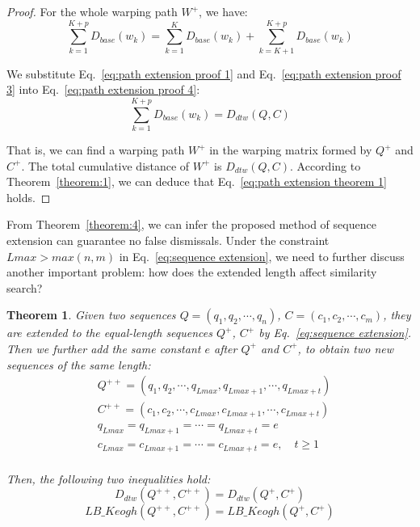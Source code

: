 \documentclass[10pt,journal,compsoc]{IEEEtran}
\newtheorem{theorem}{Theorem}
\begin{document}
\begin{proof}
For the whole warping path $W^+$, we have:
\begin{equation}\label{eq:path extension proof 4}
    \sum_{k=1}^{K+p} D_{base}(w_k)=\sum_{k=1}^{K} D_{base}(w_k)+\sum_{k=K+1}^{K+p} D_{base}(w_k)
\end{equation}

We substitute Eq.~\eqref{eq:path extension proof 1} and Eq.~\eqref{eq:path extension proof 3} into Eq.~\eqref{eq:path extension proof 4}:
\begin{equation}\label{eq:path extension proof 5}
    \sum_{k=1}^{K+p} D_{base}(w_k)=D_{dtw}(Q,C)
\end{equation}

That is, we can find a warping path $W^+$ in the warping matrix formed by $Q^+$ and $C^+$.
The total cumulative distance of $W^+$ is $D_{dtw}(Q,C)$.
According to Theorem~\ref{theorem:1},
we can deduce that Eq.~\eqref{eq:path extension theorem 1} holds.
\end{proof}

From Theorem~\ref{theorem:4},
we can infer the proposed method of sequence extension can guarantee no false dismissals.
Under the constraint $Lmax > max(n,m)$ in Eq.~\eqref{eq:sequence extension},
we need to further discuss another important problem:
how does the extended length affect similarity search?

\begin{theorem} \label{theorem:6}
  Given two sequences $Q=(q_1, q_2, \cdots, q_n)$, $C=(c_1, c_2, \cdots, c_m)$,
  they are extended to the equal-length sequences $Q^+$, $C^+$ by Eq.~\eqref{eq:sequence extension}.
  Then we further add the same constant $e$ after $Q^+$ and $C^+$,
  to obtain two new sequences of the same length:
  \begin{equation}\label{eq:sequence extension further}
  \begin{split}
    & Q^{++}=(q_1, q_2, \cdots, q_{Lmax}, q_{Lmax+1}, \cdots,q_{Lmax+t}) \\
    & C^{++}=(c_1, c_2, \cdots, c_{Lmax}, c_{Lmax+1}, \cdots,c_{Lmax+t}) \\
    & q_{Lmax}=q_{Lmax+1}=\cdots=q_{Lmax+t}=e \\
    & c_{Lmax}=c_{Lmax+1}=\cdots=c_{Lmax+t}=e, \quad t\geq 1 \\
  \end{split}
  \end{equation}

  Then, the following two inequalities hold:
  \begin{equation}\label{eq:path extension further theorem 1}
   D_{dtw}(Q^{++},C^{++})= D_{dtw}(Q^+,C^+)
  \end{equation}
  \begin{equation}\label{eq:path extension further theorem 2}
   LB\_Keogh(Q^{++},C^{++})=LB\_Keogh(Q^+,C^+)
  \end{equation}
\end{theorem}
\end{document}
